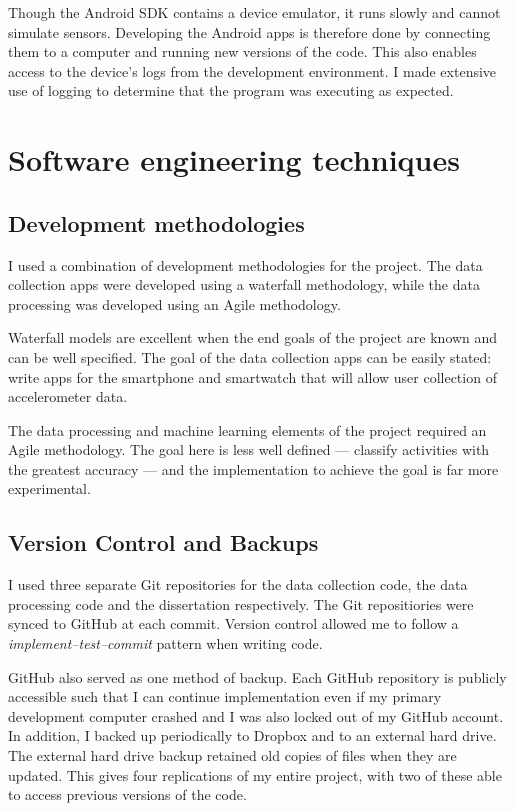       Though the Android SDK contains a device emulator, it runs slowly and cannot simulate sensors. Developing the Android apps is therefore done by connecting them to a computer and running new versions of the code. This also enables access to the device's logs from the development environment. I made extensive use of logging to determine that the program was executing as expected.
  \section{Software engineering techniques}
    \subsection{Development methodologies}
      I used a combination of development methodologies for the project. The data collection apps were developed using a waterfall methodology, while the data processing was developed using an Agile methodology.
      
      Waterfall models are excellent when the end goals of the project are known and can be well specified. The goal of the data collection apps can be easily stated: write apps for the smartphone and smartwatch that will allow user collection of accelerometer data.
      
      The data processing and machine learning elements of the project required an Agile methodology. The goal here is less well defined --- classify activities with the greatest accuracy --- and the implementation to achieve the goal is far more experimental.
      
    \subsection{Version Control and Backups}
      I used three separate Git repositories for the data collection code, the data processing code and the dissertation respectively. The Git repositiories were synced to GitHub at each commit. Version control allowed me to follow a \emph{implement--test--commit} pattern when writing code. 
      
      GitHub also served as one method of backup. Each GitHub repository is publicly accessible such that I can continue implementation even if my primary development computer crashed and I was also locked out of my GitHub account. In addition, I backed up periodically to Dropbox and to an external hard drive. The external hard drive backup retained old copies of files when they are updated. This gives four replications of my entire project, with two of these able to access previous versions of the code.  
